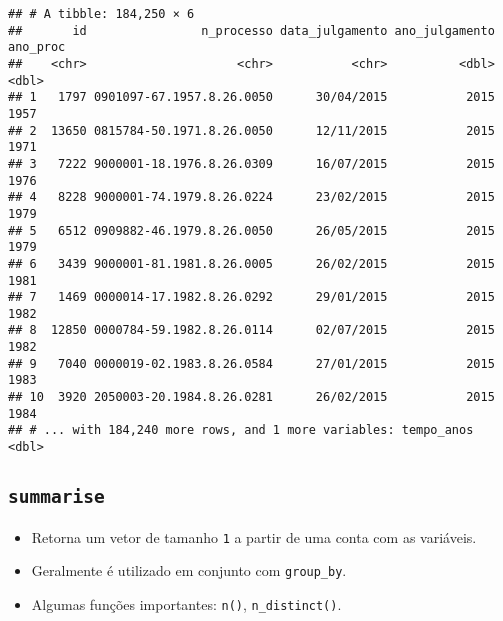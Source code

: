 \documentclass[]{book}
\newenvironment{Shaded}{\begin{snugshade}}{\end{snugshade}}
\newcommand{\KeywordTok}[1]{\textcolor[rgb]{0.13,0.29,0.53}{\textbf{{#1}}}}
\newcommand{\DataTypeTok}[1]{\textcolor[rgb]{0.13,0.29,0.53}{{#1}}}
\newcommand{\DecValTok}[1]{\textcolor[rgb]{0.00,0.00,0.81}{{#1}}}
\newcommand{\StringTok}[1]{\textcolor[rgb]{0.31,0.60,0.02}{{#1}}}
\newcommand{\NormalTok}[1]{{#1}}
\providecommand{\tightlist}{%
  \setlength{\itemsep}{0pt}\setlength{\parskip}{0pt}}
\begin{document}
\begin{Shaded}
\end{Shaded}

\begin{verbatim}
## # A tibble: 184,250 × 6
##       id                n_processo data_julgamento ano_julgamento ano_proc
##    <chr>                     <chr>           <chr>          <dbl>    <dbl>
## 1   1797 0901097-67.1957.8.26.0050      30/04/2015           2015     1957
## 2  13650 0815784-50.1971.8.26.0050      12/11/2015           2015     1971
## 3   7222 9000001-18.1976.8.26.0309      16/07/2015           2015     1976
## 4   8228 9000001-74.1979.8.26.0224      23/02/2015           2015     1979
## 5   6512 0909882-46.1979.8.26.0050      26/05/2015           2015     1979
## 6   3439 9000001-81.1981.8.26.0005      26/02/2015           2015     1981
## 7   1469 0000014-17.1982.8.26.0292      29/01/2015           2015     1982
## 8  12850 0000784-59.1982.8.26.0114      02/07/2015           2015     1982
## 9   7040 0000019-02.1983.8.26.0584      27/01/2015           2015     1983
## 10  3920 2050003-20.1984.8.26.0281      26/02/2015           2015     1984
## # ... with 184,240 more rows, and 1 more variables: tempo_anos <dbl>
\end{verbatim}

\subsection{\texorpdfstring{\texttt{summarise}}{summarise}}\label{summarise}

\begin{itemize}
\tightlist
\item
  Retorna um vetor de tamanho \texttt{1} a partir de uma conta com as
  variáveis.
\item
  Geralmente é utilizado em conjunto com \texttt{group\_by}.
\item
  Algumas funções importantes: \texttt{n()}, \texttt{n\_distinct()}.
\end{itemize}
\end{document}
